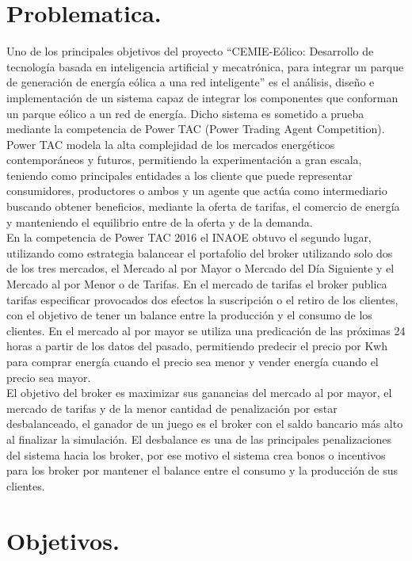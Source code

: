 \section{Problematica.}
Uno de los principales objetivos del proyecto “CEMIE-Eólico: Desarrollo de tecnología basada en inteligencia artificial y mecatrónica, para integrar un parque de generación de energía eólica a una red inteligente” es el análisis, diseño e implementación de un sistema capaz de integrar los componentes que conforman un parque eólico a un red de energía. Dicho sistema es sometido a prueba mediante la competencia de Power TAC (Power Trading Agent Competition).
\\

Power TAC modela la alta complejidad de los mercados energéticos contemporáneos y futuros, permitiendo la experimentación a gran escala, teniendo como principales entidades a los cliente que puede representar consumidores,  productores o ambos y un agente que actúa como intermediario buscando obtener beneficios, mediante la oferta de tarifas, el comercio de energía y manteniendo el equilibrio entre de la oferta y de la demanda.
\\
 
En la competencia de Power TAC 2016 el INAOE obtuvo el segundo lugar, utilizando como estrategia balancear el portafolio del broker utilizando solo dos de los tres mercados, el Mercado al por Mayor o Mercado del Día Siguiente y el Mercado al por Menor o de Tarifas. En el mercado de tarifas el broker publica tarifas especificar provocados dos efectos la suscripción o el retiro de los clientes, con el objetivo de tener un balance entre la producción y el consumo de los clientes. En el mercado al por mayor se utiliza una predicación de las próximas 24 horas a partir de los datos del pasado, permitiendo predecir el precio por Kwh para comprar energía cuando el precio sea menor y vender energía cuando el precio sea mayor.
\\
 
El objetivo del broker es maximizar sus ganancias del mercado al por mayor,  el mercado de tarifas y de la menor cantidad de penalización por estar desbalanceado, el ganador de un juego es el broker con el saldo bancario más alto al finalizar la simulación. El desbalance es una de las principales penalizaciones del sistema hacia los broker, por ese motivo el sistema crea bonos o incentivos  para los broker por mantener el balance entre el consumo y la producción de sus clientes.

\section{Objetivos.}
